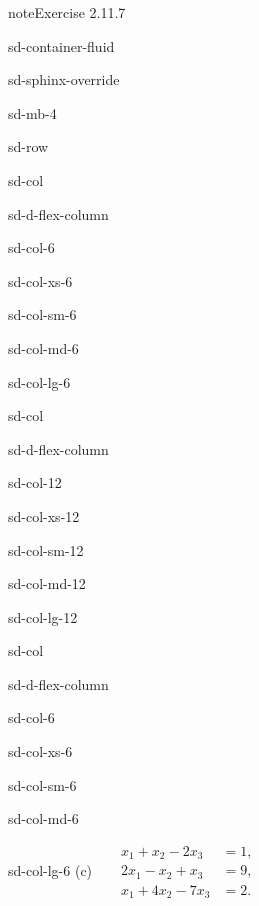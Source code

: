 \documentclass[letterpaper,10pt,english]{jupyterBook}
\begin{document}
\begin{sphinxadmonition}{note}{Exercise 2.11.7}
\begin{sphinxuseclass}{sd-container-fluid}
\begin{sphinxuseclass}{sd-sphinx-override}
\begin{sphinxuseclass}{sd-mb-4}
\begin{sphinxuseclass}{sd-row}
\begin{sphinxuseclass}{sd-col}
\begin{sphinxuseclass}{sd-d-flex-column}
\begin{sphinxuseclass}{sd-col-6}
\begin{sphinxuseclass}{sd-col-xs-6}
\begin{sphinxuseclass}{sd-col-sm-6}
\begin{sphinxuseclass}{sd-col-md-6}
\begin{sphinxuseclass}{sd-col-lg-6}
\end{sphinxuseclass}
\end{sphinxuseclass}
\end{sphinxuseclass}
\end{sphinxuseclass}
\end{sphinxuseclass}
\end{sphinxuseclass}
\end{sphinxuseclass}
\begin{sphinxuseclass}{sd-col}
\begin{sphinxuseclass}{sd-d-flex-column}
\begin{sphinxuseclass}{sd-col-12}
\begin{sphinxuseclass}{sd-col-xs-12}
\begin{sphinxuseclass}{sd-col-sm-12}
\begin{sphinxuseclass}{sd-col-md-12}
\begin{sphinxuseclass}{sd-col-lg-12}
\sphinxAtStartPar
 

\end{sphinxuseclass}
\end{sphinxuseclass}
\end{sphinxuseclass}
\end{sphinxuseclass}
\end{sphinxuseclass}
\end{sphinxuseclass}
\end{sphinxuseclass}
\begin{sphinxuseclass}{sd-col}
\begin{sphinxuseclass}{sd-d-flex-column}
\begin{sphinxuseclass}{sd-col-6}
\begin{sphinxuseclass}{sd-col-xs-6}
\begin{sphinxuseclass}{sd-col-sm-6}
\begin{sphinxuseclass}{sd-col-md-6}
\begin{sphinxuseclass}{sd-col-lg-6}
\sphinxAtStartPar
(c)  
\( \begin{align*}
     x_{1} +  x_{2} - 2 x_{3} &= 1, \\
     2 x_{1} -  x_{2} +  x_{3} &= 9, \\
     x_{1} + 4 x_{2} - 7 x_{3} &= 2.
\end{align*} \)


\end{sphinxuseclass}
\end{sphinxuseclass}
\end{sphinxuseclass}
\end{sphinxuseclass}
\end{sphinxuseclass}
\end{sphinxuseclass}
\end{sphinxuseclass}
\end{sphinxuseclass}
\end{sphinxuseclass}
\end{sphinxuseclass}
\end{sphinxuseclass}
\end{sphinxadmonition}
\end{document}
